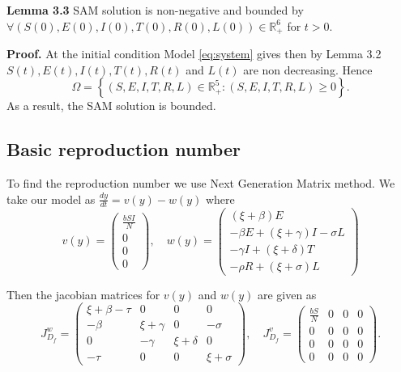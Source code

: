 \documentclass[10pt]{article}
\begin{document}
	\textbf{Lemma 3.3} SAM solution is non-negative and bounded by $\forall(S(0),E(0),I(0),T(0),R(0),L(0))\in \mathbb{R}_{+}^{6}$ for $t>0$.
	
	\textbf{Proof.} At the initial condition Model \eqref{eq:system} gives then by Lemma 3.2 $S(t),E(t),I(t),T(t),R(t)$ and $L(t)$ are non decreasing. Hence
	\begin{equation}
		\Omega = \left\{ (S,E,I,T,R,L)\in \mathbb{R}_{+}^{5} : (S,E,I,T,R,L) \geq 0 \right\}.
		\label{eq:positivity}
	\end{equation}
	As a result, the SAM solution is bounded.
	
	\subsection{Basic reproduction number}
	
	To find the reproduction number we use Next Generation Matrix method. We take our model as $\frac{dy}{dt} = v(y) - w(y)$ where
	\begin{equation}
		v(y) = \begin{pmatrix} \frac{b SI}{N} \\ 0 \\ 0 \\ 0 \end{pmatrix}, \quad
		w(y) = \begin{pmatrix} (\xi + \beta)E \\ -\beta E + (\xi + \gamma)I - \sigma L \\ -\gamma I + (\xi + \delta)T \\ -\rho R + (\xi + \sigma)L \end{pmatrix}
		\label{eq:nextgen}
	\end{equation}
	
	Then the jacobian matrices for $v(y)$ and $w(y)$ are given as
	\begin{equation}
		J_{D_{f}}^{w} = 
		\begin{pmatrix}
			\xi + \beta - \tau & 0 & 0 & 0 \\
			-\beta & \xi + \gamma & 0 & -\sigma \\
			0 & -\gamma & \xi + \delta & 0 \\
			-\tau & 0 & 0 & \xi + \sigma
		\end{pmatrix}, \quad
		J_{D_{f}}^{v} = 
		\begin{pmatrix}
			\frac{b S}{N} & 0 & 0 & 0 \\
			0 & 0 & 0 & 0 \\
			0 & 0 & 0 & 0 \\
			0 & 0 & 0 & 0
		\end{pmatrix}.
		\label{eq:jacobians}
	\end{equation}
	
\end{document}
